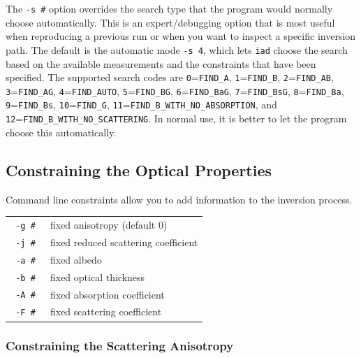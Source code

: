 \documentclass{article}
\newcommand\iadprog{\texttt{iad}}
\begin{document}
The \texttt{-s \#} option overrides the search type that the program would
normally choose automatically.  This is an expert/debugging option that is most
useful when reproducing a previous run or when you want to inspect a specific
inversion path.  The default is the automatic mode \texttt{-s 4}, which lets
\iadprog{} choose the search based on the available measurements and the
constraints that have been specified.  The supported search codes are
\texttt{0}=\texttt{FIND\_A}, \texttt{1}=\texttt{FIND\_B},
\texttt{2}=\texttt{FIND\_AB}, \texttt{3}=\texttt{FIND\_AG},
\texttt{4}=\texttt{FIND\_AUTO}, \texttt{5}=\texttt{FIND\_BG},
\texttt{6}=\texttt{FIND\_BaG}, \texttt{7}=\texttt{FIND\_BsG},
\texttt{8}=\texttt{FIND\_Ba}, \texttt{9}=\texttt{FIND\_Bs},
\texttt{10}=\texttt{FIND\_G}, \texttt{11}=\texttt{FIND\_B\_WITH\_NO\_ABSORPTION},
and \texttt{12}=\texttt{FIND\_B\_WITH\_NO\_SCATTERING}.  In normal use, it is
better to let the program choose this automatically.

\subsection{Constraining the Optical Properties}

Command line constraints allow you to add information to the inversion 
process.

\begin{center}
\begin{tabular}{lp{7cm}}
\texttt{ -g \#               }& fixed anisotropy (default 0)               \\
\texttt{ -j \#               }& fixed reduced scattering coefficient       \\
\texttt{ -a \#               }& fixed albedo                               \\
\texttt{ -b \#               }& fixed optical thickness                    \\
\texttt{ -A \#               }& fixed absorption coefficient               \\
\texttt{ -F \#               }& fixed scattering coefficient               \\[3mm]
\end{tabular}
\end{center}

\subsubsection{Constraining the Scattering Anisotropy}
\end{document}
